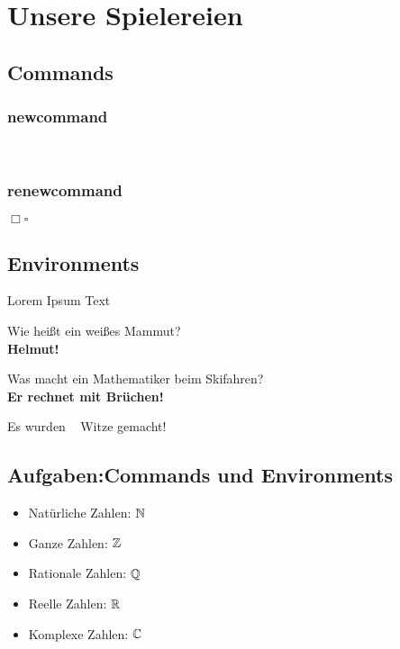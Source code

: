 \documentclass{uebungsblatt}
\begin{document}
\maketitle



\section*{Unsere Spielereien}

\subsection*{Commands}
\subsubsection*{newcommand}
\hello \\
\hello[Jules]

\subsubsection*{renewcommand}
\noindent
$\Box\square$


\subsection*{Environments}

\begin{para}{Lorem Ipsum Text}
    \lipsum[2-3]
\end{para}


\begin{joke}
    Wie heißt ein weißes Mammut?\\
    \textbf{Helmut!}
\end{joke}

\begin{joke}
    Was macht ein Mathematiker beim Skifahren?\\
    \textbf{Er rechnet mit Brüchen!}
\end{joke}

\noindent
Es wurden \thejoke~ Witze gemacht!


\subsection*{Aufgaben:\quad Commands und Environments}
\begin{itemize}
    \item Natürliche Zahlen: $\mathbb{N}$
    \item Ganze Zahlen: $\mathbb{Z}$
    \item Rationale Zahlen: $\mathbb{Q}$
    \item Reelle Zahlen: $\mathbb{R}$
    \item Komplexe Zahlen: $\mathbb{C}$
\end{itemize}
\end{document}
